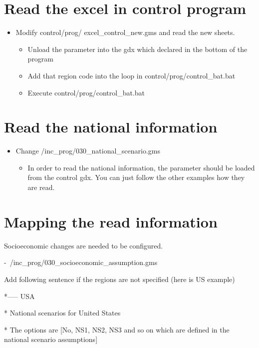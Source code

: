 \documentclass[10pt,a4paper,titlepage,dvipdfmx]{book}
\begin{document}
\section{\label{sec:ReaExcConPro}Read the excel in control program}


\begin{itemize}
\item Modify control/prog/ excel\_control\_new.gms and read the new sheets.
\begin{itemize}
\item Unload the parameter into the gdx which declared in the bottom of the program
\item Add that region code into the loop in control/prog/control\_bat.bat
\item Execute control/prog/control\_bat.bat 
\end{itemize}

\end{itemize}
\section{\label{sec:ReaNatInf}Read the national information}


\begin{itemize}
\item Change /inc\_prog/030\_national\_scenario.gms
\begin{itemize}
\item In order to read the national information, the parameter should be loaded from the control gdx. You can just follow the other examples how they are read.
\end{itemize}

\end{itemize}
\section{\label{sec:MpReaInf}Mapping the read information}

Socioeconomic changes are needed to be configured.

-~/inc\_prog/030\_socioeconomic\_assumption.gms

Add following sentence if the regions are not specified (here is US example)

*----- USA

* National scenarios for United States

* The options are [No, NS1, NS2, NS3 and so on which are defined in the national scenario assumptions]
\end{document}

